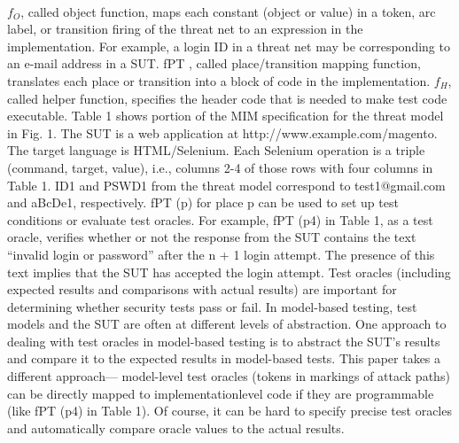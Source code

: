 \paragraph{}
$f_O$, called object function, maps each constant (object or value) in a token, arc label, or transition firing of the threat net to an expression in the implementation. For example, a login ID in a threat net may be corresponding to an e-mail address in a SUT. fPT , called place/transition mapping function, translates each place or transition into a block of code in the implementation. $f_H$, called helper function, specifies the header code that is needed to make test code executable. Table 1 shows portion of the MIM specification for the threat model in Fig. 1. The SUT is a web application at http://www.example.com/magento. The target language is HTML/Selenium. Each Selenium operation is a triple (command, target, value), i.e., columns 2-4 of those rows with four columns in Table 1. ID1 and PSWD1 from the threat model correspond to test1@gmail.com and aBcDe1, respectively. fPT (p) for place p can be used to set up test conditions or evaluate test oracles. For example, fPT (p4) in Table 1, as a test oracle, verifies whether or not the response from the SUT contains the text “invalid login or password” after the n + 1 login attempt. The presence of this text implies that the SUT has accepted the login attempt. Test oracles (including expected results and comparisons with actual
results) are important for determining whether security tests pass or fail. In model-based testing, test models and the SUT are often at different levels of abstraction. One approach to dealing with test oracles in model-based testing is to abstract the SUT’s results and compare it to the expected results in model-based tests. This paper takes a different approach— model-level test oracles (tokens in markings of attack paths) can be directly mapped to implementationlevel
code if they are programmable (like fPT (p4) in Table 1). Of course, it can be hard to specify precise test oracles and automatically compare oracle values to the actual results.

